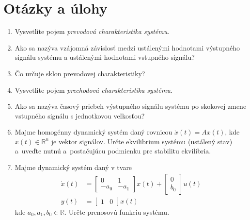 \documentclass[a4paper, 10pt, ]{article}
\begin{document}
\section{Otázky a úlohy}

\begin{enumerate}[leftmargin=0pt, labelsep=3mm, itemsep=0pt]

    
    \item Vysvetlite pojem \emph{prevodová charakteristika systému}.

        \item Ako sa nazýva vzájomná závislosť medzi ustálenými hodnotami výstupného signálu systému a ustálenými hodnotami vstupného signálu?

        \item Čo určuje sklon prevodovej charakteristiky?


        \item Vysvetlite pojem \emph{prechodová charakteristika systému}.

        \item Ako sa nazýva časový priebeh výstupného signálu systému po skokovej zmene vstupného signálu s jednotkovou veľkosťou?



        \item Majme homogénny dynamický systém daný rovnicou $ \dot x(t) = A x(t) $, kde $x(t) \in \mathbb R^n$ je vektor signálov. Určte ekvilibrium systému (ustálený stav) a~uveďte nutnú a~postačujúcu podmienku pre stabilitu ekvilibria.

        \item Majme dynamický systém daný v tvare
        \begin{align*}
            \dot x(t)
            &=
            \begin{bmatrix}
                0 & 1 \\
                - a_0  & - a_1
            \end{bmatrix}
            x(t)
            +
            \begin{bmatrix}
                0\\ b_0
            \end{bmatrix}
            u(t)
            \\
            y(t) &= \begin{bmatrix} 1 & 0 \end{bmatrix} x(t)
        \end{align*}
        kde $a_0, a_1, b_0\in\mathbb R$. Určte prenosovú funkciu systému.

\end{enumerate}
\end{document}

